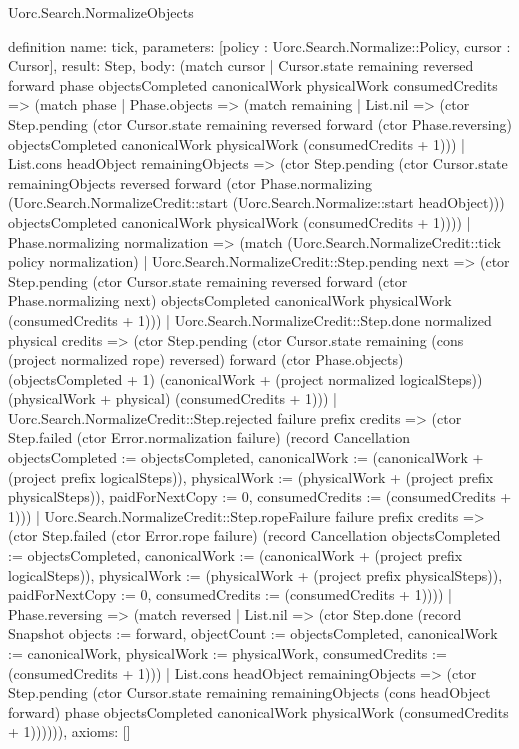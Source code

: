\begin{lexlean}{Uorc.Search.NormalizeObjects}
\begin{semanticmodule}
definition{
  name: tick,
  parameters: [policy : Uorc.Search.Normalize::Policy, cursor : Cursor],
  result: Step,
  body: (match cursor
    | Cursor.state remaining reversed forward phase objectsCompleted canonicalWork physicalWork consumedCredits => (match phase
      | Phase.objects => (match remaining
        | List.nil => (ctor Step.pending (ctor Cursor.state remaining reversed forward (ctor Phase.reversing) objectsCompleted canonicalWork physicalWork (consumedCredits + 1)))
        | List.cons headObject remainingObjects => (ctor Step.pending (ctor Cursor.state remainingObjects reversed forward (ctor Phase.normalizing (Uorc.Search.NormalizeCredit::start (Uorc.Search.Normalize::start headObject))) objectsCompleted canonicalWork physicalWork (consumedCredits + 1))))
      | Phase.normalizing normalization => (match (Uorc.Search.NormalizeCredit::tick policy normalization)
        | Uorc.Search.NormalizeCredit::Step.pending next => (ctor Step.pending (ctor Cursor.state remaining reversed forward (ctor Phase.normalizing next) objectsCompleted canonicalWork physicalWork (consumedCredits + 1)))
        | Uorc.Search.NormalizeCredit::Step.done normalized physical credits => (ctor Step.pending (ctor Cursor.state remaining (cons (project normalized rope) reversed) forward (ctor Phase.objects) (objectsCompleted + 1) (canonicalWork + (project normalized logicalSteps)) (physicalWork + physical) (consumedCredits + 1)))
        | Uorc.Search.NormalizeCredit::Step.rejected failure prefix credits => (ctor Step.failed (ctor Error.normalization failure) (record Cancellation {objectsCompleted := objectsCompleted, canonicalWork := (canonicalWork + (project prefix logicalSteps)), physicalWork := (physicalWork + (project prefix physicalSteps)), paidForNextCopy := 0, consumedCredits := (consumedCredits + 1)}))
        | Uorc.Search.NormalizeCredit::Step.ropeFailure failure prefix credits => (ctor Step.failed (ctor Error.rope failure) (record Cancellation {objectsCompleted := objectsCompleted, canonicalWork := (canonicalWork + (project prefix logicalSteps)), physicalWork := (physicalWork + (project prefix physicalSteps)), paidForNextCopy := 0, consumedCredits := (consumedCredits + 1)})))
      | Phase.reversing => (match reversed
        | List.nil => (ctor Step.done (record Snapshot {objects := forward, objectCount := objectsCompleted, canonicalWork := canonicalWork, physicalWork := physicalWork, consumedCredits := (consumedCredits + 1)}))
        | List.cons headObject remainingObjects => (ctor Step.pending (ctor Cursor.state remaining remainingObjects (cons headObject forward) phase objectsCompleted canonicalWork physicalWork (consumedCredits + 1)))))),
  axioms: []
}


\end{semanticmodule}
\end{lexlean}

